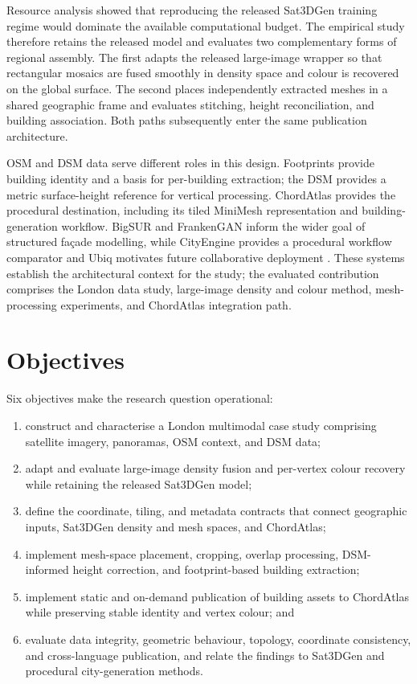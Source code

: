 Resource analysis showed that reproducing the released Sat3DGen training
regime would dominate the available computational budget.  The empirical study
therefore retains the released model and evaluates two complementary forms of
regional assembly.  The first adapts the released large-image wrapper so that
rectangular mosaics are fused smoothly in density space and colour is recovered
on the global surface.  The second places independently extracted meshes in a
shared geographic frame and evaluates stitching, height reconciliation, and
building association.  Both paths subsequently enter the same publication
architecture.

OSM and DSM data serve different roles in this design.  Footprints provide
building identity and a basis for per-building extraction; the DSM provides a
metric surface-height reference for vertical processing.  ChordAtlas provides
the procedural destination, including its tiled MiniMesh representation and
building-generation workflow.  BigSUR and FrankenGAN inform the wider goal of
structured fa\c{c}ade modelling, while CityEngine provides a procedural
workflow comparator and Ubiq motivates future collaborative deployment
\cite{kelly2017bigsur,kelly2018frankengan,esriCityEngineIntro2026,
friston2021ubiq}.  These systems establish the architectural context for the
study; the evaluated contribution comprises the London data study, large-image
density and colour method, mesh-processing experiments, and ChordAtlas
integration path.

\section{Objectives}

Six objectives make the research question operational:

\begin{enumerate}
  \item construct and characterise a London multimodal case study comprising
  satellite imagery, panoramas, OSM context, and DSM data;
  \item adapt and evaluate large-image density fusion and per-vertex colour
  recovery while retaining the released Sat3DGen model;
  \item define the coordinate, tiling, and metadata contracts that connect
  geographic inputs, Sat3DGen density and mesh spaces, and ChordAtlas;
  \item implement mesh-space placement, cropping, overlap processing,
  DSM-informed height correction, and footprint-based building extraction;
  \item implement static and on-demand publication of building assets to
  ChordAtlas while preserving stable identity and vertex colour; and
  \item evaluate data integrity, geometric behaviour, topology, coordinate
  consistency, and cross-language publication, and relate the findings to
  Sat3DGen and procedural city-generation methods.
\end{enumerate}

